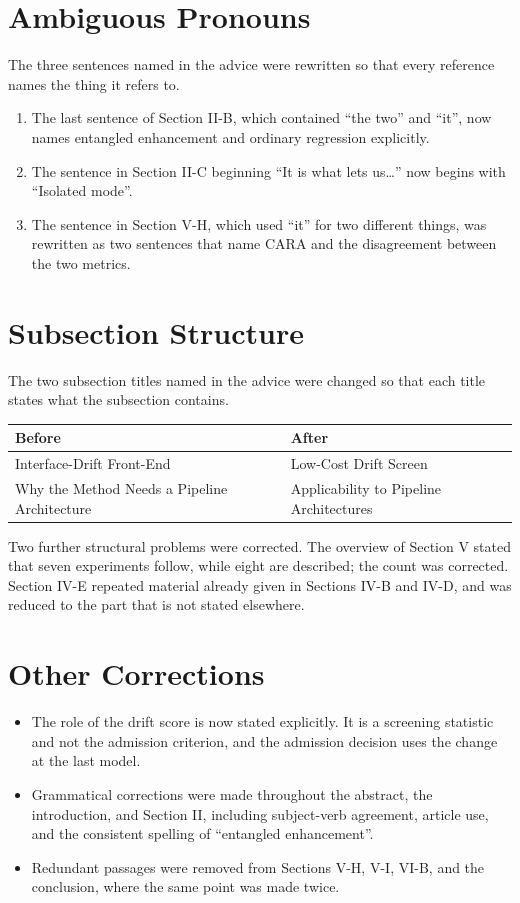 \documentclass[11pt,a4paper]{article}
\begin{document}
\section{Ambiguous Pronouns}
The three sentences named in the advice were rewritten so that every reference
names the thing it refers to.

\begin{enumerate}[leftmargin=*]
\item The last sentence of Section II-B, which contained ``the two'' and ``it'',
now names entangled enhancement and ordinary regression explicitly.
\item The sentence in Section II-C beginning ``It is what lets us\ldots'' now
begins with ``Isolated mode''.
\item The sentence in Section V-H, which used ``it'' for two different things,
was rewritten as two sentences that name CARA and the disagreement between the two
metrics.
\end{enumerate}

\section{Subsection Structure}
The two subsection titles named in the advice were changed so that each title
states what the subsection contains.

\begin{center}
\begin{tabular}{@{}p{}p{}@{}}
\toprule
\textbf{Before} & \textbf{After} \\
\midrule
Interface-Drift Front-End & Low-Cost Drift Screen \\
Why the Method Needs a Pipeline Architecture & Applicability to Pipeline
Architectures \\
\bottomrule
\end{tabular}
\end{center}

\noindent
Two further structural problems were corrected. The overview of Section V stated
that seven experiments follow, while eight are described; the count was corrected.
Section IV-E repeated material already given in Sections IV-B and IV-D, and was
reduced to the part that is not stated elsewhere.

\section{Other Corrections}
\begin{itemize}[leftmargin=*]
\item The role of the drift score is now stated explicitly. It is a screening
statistic and not the admission criterion, and the admission decision uses the
change at the last model.
\item Grammatical corrections were made throughout the abstract, the introduction,
and Section II, including subject-verb agreement, article use, and the consistent
spelling of ``entangled enhancement''.
\item Redundant passages were removed from Sections V-H, V-I, VI-B, and the
conclusion, where the same point was made twice.
\end{itemize}
\end{document}
